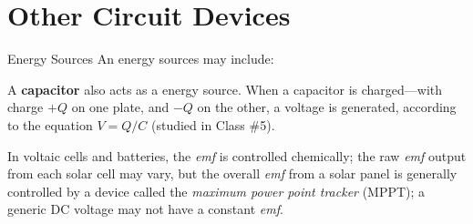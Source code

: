 \documentclass[12pt,aspectratio=169]{beamer}
\begin{document}
\section{Other Circuit Devices}

\begin{frame}{Energy Sources}
  An energy sources may include:
  \begin{center}
  \end{center}
  A \textbf{capacitor} also acts as a energy source. When a capacitor is
  charged---with charge $+Q$ on one plate, and $-Q$ on the other, a voltage
  is generated, according to the equation $V=Q/C$ (studied in Class \#5).
  \begin{center}
  \end{center}
  In voltaic cells and batteries, the \emph{emf} is controlled chemically; the
  raw \emph{emf} output from each solar cell may vary, but the overall
  \emph{emf} from a solar panel is generally controlled by a device called the
  \emph{maximum power point tracker} (MPPT); a generic DC voltage may not have
  a constant \emph{emf}.
\end{frame}
\end{document}
